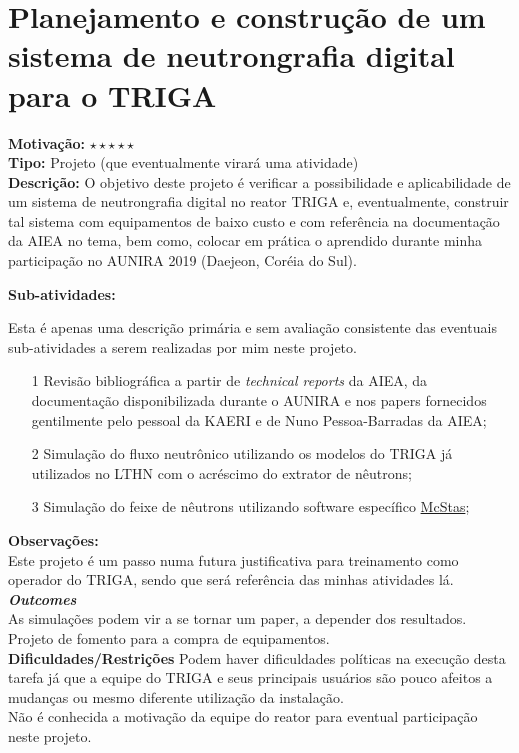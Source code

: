 \chapter{Planejamento e construção de um sistema de neutrongrafia digital para o TRIGA}

\textbf{Motivação:} $\star\star\star\star\star$\\

\textbf{Tipo:} Projeto (que eventualmente virará  uma atividade)\\

\textbf{Descrição:} O objetivo deste projeto é verificar a possibilidade e aplicabilidade de um sistema
de neutrongrafia digital no reator TRIGA e, eventualmente, construir tal sistema com equipamentos
de baixo custo e com referência na documentação da AIEA no tema, bem como, colocar em prática
o aprendido durante minha participação no AUNIRA 2019 (Daejeon, Coréia do Sul).

\textbf{Sub-atividades:}

Esta é apenas uma descrição primária e sem avaliação consistente das eventuais 
sub-atividades a serem realizadas por mim neste projeto.

\begin{itemize}
\item[1] Revisão bibliográfica a partir de \textit{technical reports} da AIEA, da documentação
  disponibilizada durante o AUNIRA e nos papers fornecidos gentilmente pelo pessoal da KAERI e
  de Nuno Pessoa-Barradas da AIEA;
\item[2] Simulação do fluxo neutrônico utilizando os modelos do TRIGA já utilizados no LTHN com
  o acréscimo do extrator de nêutrons;
  \item[3] Simulação do feixe de nêutrons utilizando software específico \href{http://www.mcstas.org/}{McStas};
\end{itemize}

\textbf{Observações:}\\

Este projeto é um passo numa futura justificativa para treinamento como operador do TRIGA, sendo que será referência das minhas atividades lá.\\

\textbf{\textit{Outcomes}}\\

  As simulações podem vir a se tornar um paper, a depender dos resultados.\\

  Projeto de fomento para a compra de equipamentos.\\

\textbf{Dificuldades/Restrições}
Podem haver dificuldades políticas na execução desta tarefa já que a equipe do TRIGA e seus principais
usuários são pouco afeitos a mudanças ou mesmo diferente utilização da instalação.\\

Não é conhecida a motivação da equipe do reator para eventual participação neste projeto.


